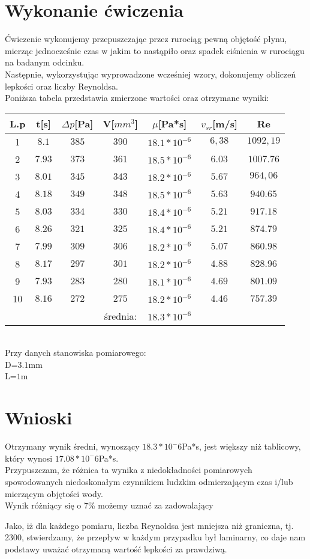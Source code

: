 \documentclass[a4paper,12pt]{article}
\begin{document}
\section{Wykonanie ćwiczenia}
Ćwiczenie wykonujemy przepuszczając przez rurociąg pewną objętość płynu, mierząc jednocześnie czas w jakim to nastąpiło oraz spadek ciśnienia w rurociągu na badanym odcinku.\\
Następnie, wykorzystując wyprowadzone wcześniej wzory, dokonujemy obliczeń lepkości oraz liczby Reynoldsa.\\
Poniższa tabela przedstawia zmierzone wartości oraz otrzymane wyniki:\\
\begin{tabular}{|c|c|c|c|c|c|c|}
\hline
L.p&t[s]&$\Delta p$[Pa]&V[$mm^3$]&$\mu$[Pa*s]&$v_{sr}$[m/s]&Re\\
\hline
1&$8.1$&$385$&$390$&$18.1*10^{-6}$&$6,38$&$1092,19$\\
2&$7.93$&$373$&$361$&$18.5*10^{-6}$&$6.03$&$1007.76$\\
3&$8.01$&$345$&$343$&$18.2*10^{-6}$&$5.67$&$964,06$\\
4&$8.18$&$349$&$348$&$18.5*10^{-6}$&$5.63$&$940.65$\\
5&$8.03$&$334$&$330$&$18.4*10^{-6}$&$5.21$&$917.18$\\
6&$8.26$&$321$&$325$&$18.4*10^{-6}$&$5.21$&$874.79$\\
7&$7.99$&$309$&$306$&$18.2*10^{-6}$&$5.07$&$860.98$\\
8&$8.17$&$297$&$301$&$18.2*10^{-6}$&$4.88$&$828.96$\\
9&$7.93$&$283$&$280$&$18.1*10^{-6}$&$4.69$&$801.09$\\
10&$8.16$&$272$&$275$&$18.2*10^{-6}$&$4.46$&$757.39$\\
\hline
&&&średnia:&$18.3*10^{-6}$&&\\
\hline
\end{tabular}\\
Przy danych stanowiska pomiarowego:\\
D=$3.1$mm\\
L=$1$m\\
\section{Wnioski}
Otrzymany wynik średni, wynoszący $18.3*10^-6$Pa*s, jest większy niż tablicowy, który wynosi $17.08*10^-6$Pa*s.\\
Przypuszczam, że różnica ta wynika z niedokładności pomiarowych spowodowanych niedoskonałym czynnikiem ludzkim odmierzającym czas i/lub mierzącym objętości wody.\\
Wynik różniący się o 7\% możemy uznać za zadowalający

Jako, iż dla każdego pomiaru, liczba Reynoldsa jest mniejsza niż graniczna, tj. 2300, stwierdzamy, że przepływ w każdym przypadku był laminarny, co daje nam podstawy uważać otrzymaną wartość lepkości za prawdziwą.
\end{document}
